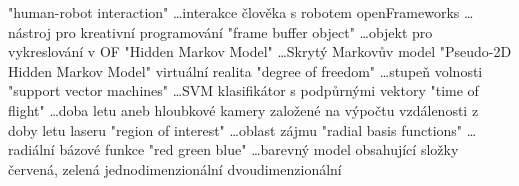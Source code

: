 
\abbrv[HRI]	"human-robot interaction" \dots interakce člověka s robotem
\abbrv[OF]	openFrameworks \dots nástroj pro kreativní programování
\abbrv[FBO]  "frame buffer object" \dots objekt pro vykreslování v OF
\abbrv[HMM]  "Hidden Markov Model" \dots Skrytý Markovův model
\abbrv[P2DHMM]  "Pseudo-2D Hidden Markov Model"
\abbrv[VR]  virtuální realita
\abbrv[DOF]  "degree of freedom" \dots stupeň volnosti
\abbrv[SVM]  "support vector machines" \dots SVM klasifikátor s podpůrnými vektory
\abbrv[TOF]  "time of flight" \dots doba letu aneb hloubkové kamery založené na výpočtu vzdálenosti z doby letu laseru
\abbrv[ROI]  "region of interest" \dots oblast zájmu
\abbrv[RBF]  "radial basis functions" \dots radiální bázové funkce
\abbrv[RGB]  "red green blue" \dots barevný model obsahující složky červená, zelená 
\abbrv[1D]   jednodimenzionální
\abbrv[2D]   dvoudimenzionální

\stopAbbreviations

\endinput
